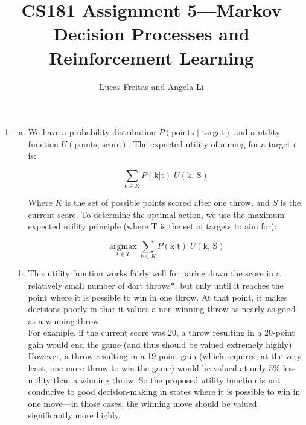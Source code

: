 \documentclass{article}
\title{CS181 Assignment 5---Markov Decision Processes and Reinforcement Learning}
\author{Lucas Freitas and Angela Li}
\begin{document}
\maketitle
    
    \begin{enumerate}
        \item
            \begin{enumerate}[(a)]
                \item We have a probability distribution $P(\text{points } | \text{ target})$ and a utility function $U(\text{points, score})$. The expected utility of aiming for a target $t$ is:

                $$\sum_{k \in K} P(\text{k} | \text{t}) \; U(\text{k, S})$$

                Where $K$ is the set of possible points scored after one throw, and $S$ is the current score. To determine the optimal action, we use the maximum expected utility principle (where T is the set of targets to aim for):

                $$\underset{t \in T}{\operatorname{argmax}} \sum_{k \in K} P(\text{k} | \text{t}) \; U(\text{k, S})$$

                \item This utility function works fairly well for paring down the score in a relatively small number of dart throws*, but only until it reaches the point where it is possible to win in one throw. At that point, it makes decisions poorly in that it values a non-winning throw as nearly as good as a winning throw. \\

                For example, if the current score was 20, a throw resulting in a 20-point gain would end the game (and thus should be valued extremely highly). However, a throw resulting in a 19-point gain (which requires, at the very least, one more throw to win the game) would be valued at only 5\% less utility than a winning throw. So the proposed utility function is not conducive to good decision-making in states where it is possible to win in one move---in those cases, the winning move should be valued significantly more highly. \\


\end{enumerate}
\end{enumerate}
\end{document}
